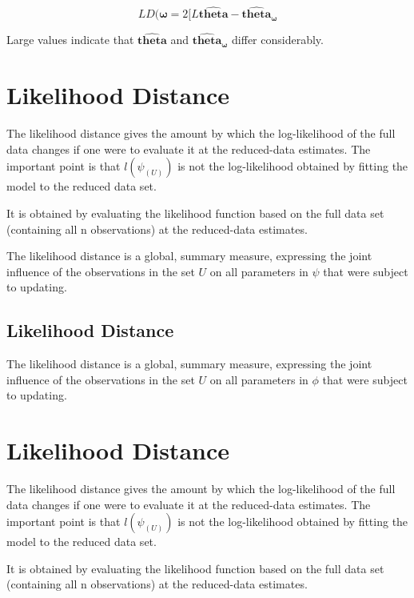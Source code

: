 \documentclass[00-ResidualsMain.tex]{subfiles}
\begin{document}
	
	\[  LD(\boldsymbol{\omega}= 2[ L\boldsymbol{\hat{theta}} - \boldsymbol{\hat{theta}_\omega} \]
	
	Large values indicate that $\boldsymbol{\hat{theta}}$ and $\boldsymbol{\hat{theta}_\omega}$ differ considerably.
	
	
\newpage
\section{Likelihood Distance} %
The likelihood distance gives the amount by which the log-likelihood of the full data changes if one were
to evaluate it at the reduced-data estimates. The important point is that $l(\psi_{(U)})$ is not the log-likelihood
obtained by fitting the model to the reduced data set.

It is obtained by evaluating the likelihood function based on the full data set (containing all n observations) at the reduced-data estimates.

The likelihood distance is a global, summary measure, expressing the joint influence of the observations in
the set $U$ on all parameters in $\psi$  that were subject to updating.

\subsection{Likelihood Distance}

The  likelihood distance is a global, summary measure, expressing the joint influence of the observations in the set $U$ on all parameters in $\phi$  that were subject to updating.






\newpage
\section{Likelihood Distance} %
The likelihood distance gives the amount by which the log-likelihood of the full data changes if one were
to evaluate it at the reduced-data estimates. The important point is that $l(\psi_{(U)})$ is not the log-likelihood
obtained by fitting the model to the reduced data set.

It is obtained by evaluating the likelihood function based on the full data set (containing all n observations) at the reduced-data estimates.
\end{document}
